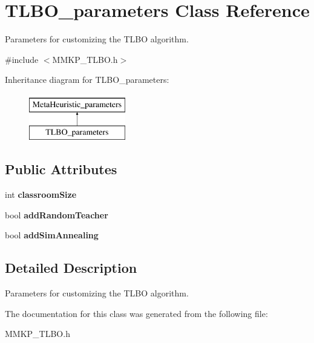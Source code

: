 \hypertarget{class_t_l_b_o__parameters}{\section{T\+L\+B\+O\+\_\+parameters Class Reference}
\label{class_t_l_b_o__parameters}
}


Parameters for customizing the T\+L\+B\+O algorithm.  




{\ttfamily \#include $<$M\+M\+K\+P\+\_\+\+T\+L\+B\+O.\+h$>$}

Inheritance diagram for T\+L\+B\+O\+\_\+parameters\+:\begin{figure}[H]
\begin{center}
\leavevmode
\includegraphics[height=2.000000cm]{class_t_l_b_o__parameters}
\end{center}
\end{figure}
\subsection*{Public Attributes}
\begin{DoxyCompactItemize}
\item 
\hypertarget{class_t_l_b_o__parameters_a8dec005b886d2fc21eee7058d13005b5}{int {\bfseries classroom\+Size}}\label{class_t_l_b_o__parameters_a8dec005b886d2fc21eee7058d13005b5}

\item 
\hypertarget{class_t_l_b_o__parameters_ab4dead72475e9a945b2bed9358152e25}{bool {\bfseries add\+Random\+Teacher}}\label{class_t_l_b_o__parameters_ab4dead72475e9a945b2bed9358152e25}

\item 
\hypertarget{class_t_l_b_o__parameters_ac4a740ceafcea10ba072738868e4d297}{bool {\bfseries add\+Sim\+Annealing}}\label{class_t_l_b_o__parameters_ac4a740ceafcea10ba072738868e4d297}

\end{DoxyCompactItemize}


\subsection{Detailed Description}
Parameters for customizing the T\+L\+B\+O algorithm. 

The documentation for this class was generated from the following file\+:\begin{DoxyCompactItemize}
\item 
M\+M\+K\+P\+\_\+\+T\+L\+B\+O.\+h\end{DoxyCompactItemize}
